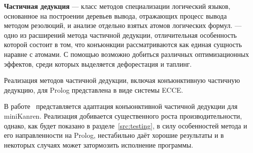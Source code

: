 {\bf Частичная дедукция} --- класс методов специализации логический языков,
основанное на построении деревьев вывода, отражающих процесс вывода методом резолюций,
и анализе отдельно взятых атомов логических формул\cite{advanced}.
\Cpd --- одно из расширений метода частичной дедукции, отличительная особенность которой
состоит в том, что конъюнкции рассматриваются как единая сущность наравне с атомами\cite{cpd}.
С помощью \forcpd возможно добиться различных оптимизационных эффектов, среди которых
выделяется дефорестация и таплинг.

Реализация методов частичной дедукции, включая конъюнктивную частичную дедукцию, для Prolog
представлена в виде системы ECCE\cite{ecce}.

В работе~\cite{lozov} представляется адаптация конъюнктивной частичной дедукции для miniKanren.
Реализация добивается существенного роста производительности, однако,
как будет показано в разделе~\ref{src:testing}, в силу особенностей метода и его
направленности на Prolog, нестабильно даёт хорошие результаты и
в некоторых случаях может затормозить исполнение программы.
